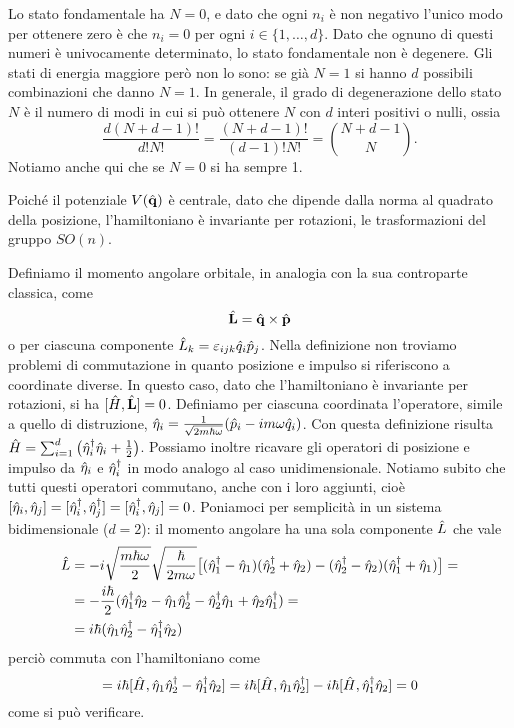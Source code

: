 Lo stato fondamentale ha $N=0$, e dato che ogni $n_i$ è non negativo l'unico modo per ottenere zero è che $n_i=0$ per ogni $i\in\{1,\dots,d\}$.
Dato che ognuno di questi numeri è univocamente determinato, lo stato fondamentale non è degenere.
Gli stati di energia maggiore però non lo sono: se già $N=1$ si hanno $d$ possibili combinazioni che danno $N=1$.
In generale, il grado di degenerazione dello stato $N$ è il numero di modi in cui si può ottenere $N$ con $d$ interi positivi o nulli, ossia
\begin{equation}
	\frac{d(N+d-1)!}{d!N!}=\frac{(N+d-1)!}{(d-1)!N!}=\binom{N+d-1}{N}.
\end{equation}
Notiamo anche qui che se $N=0$ si ha sempre 1.

Poich\'e il potenziale $V(\hat{\mathbf{q}})$ è centrale, dato che dipende dalla norma al quadrato della posizione, l'hamiltoniano è invariante per rotazioni, le trasformazioni del gruppo $SO(n)$.

Definiamo il momento angolare orbitale, in analogia con la sua controparte classica, come
\begin{equation}
	\hat{\mathbf{L}}=\hat{\mathbf{q}}\times\hat{\mathbf{p}}
\end{equation}
o per ciascuna componente $\hat{L}_k=\varepsilon_{ijk}\hat{q}_i\hat{p}_j$.
Nella definizione non troviamo problemi di commutazione in quanto posizione e impulso si riferiscono a coordinate diverse.
In questo caso, dato che l'hamiltoniano è invariante per rotazioni, si ha $[\hat{H},\hat{\mathbf{L}}]=0$.
Definiamo per ciascuna coordinata l'operatore, simile a quello di distruzione, $\hat{\eta}_i=\frac1{\sqrt{2m\hbar\omega}}(\hat{p}_i-im\omega\hat{q}_i)$.
Con questa definizione risulta $\hat{H}=\sum_{i=1}^d\big(\hat{\eta}_i^\dagger\hat{\eta}_i+\frac12\big)$.
Possiamo inoltre ricavare gli operatori di posizione e impulso da $\hat{\eta}_i$ e $\hat{\eta}_i^\dagger$ in modo analogo al caso unidimensionale.
Notiamo subito che tutti questi operatori commutano, anche con i loro aggiunti, cioè $[\hat{\eta}_i,\hat{\eta}_j]=[\hat{\eta}_i^\dagger,\hat{\eta}_j^\dagger]=[\hat{\eta}_i^\dagger,\hat{\eta}_j]=0$.
Poniamoci per semplicità in un sistema bidimensionale ($d=2$): il momento angolare ha una sola componente $\hat{L}$ che vale
\begin{equation}
	\begin{split}
		\hat{L}&=-i\sqrt{\frac{m\hbar\omega}2}\sqrt{\frac{\hbar}{2m\omega}}\big[(\hat{\eta}_1^\dagger-\hat{\eta}_1)(\hat{\eta}_2^\dagger+\hat{\eta}_2)-(\hat{\eta}_2^\dagger-\hat{\eta}_2)(\hat{\eta}_1^\dagger+\hat{\eta}_1)\big]=\\
		&=-\frac{i\hbar}2(\hat{\eta}_1^\dagger\hat{\eta}_2-\hat{\eta}_1\hat{\eta}_2^\dagger-\hat{\eta}_2^\dagger\hat{\eta}_1+\hat{\eta}_2\hat{\eta}_1^\dagger)=\\
		&=i\hbar(\hat{\eta}_1\hat{\eta}_2^\dagger-\hat{\eta}_1^\dagger\hat{\eta}_2)
	\end{split}
\end{equation}
perciò commuta con l'hamiltoniano come
\begin{equation}
	[\op H,\op L]=i\hbar[\op H,\op\eta_1\adj{\op\eta_2}-\adj{\op\eta_1}\op\eta_2]=i\hbar[\op H,\op\eta_1\adj{\op\eta_2}]-i\hbar[\op H,\adj{\op\eta_1}\op\eta_2]=0
\end{equation}
come si può verificare.

